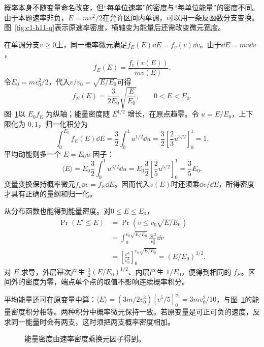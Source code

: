 \begin{solution}
概率本身不随变量命名改变，但“每单位速率”的密度与“每单位能量”的密度不同。由于本题速率非负，$E=mv^2/2$在允许区间内单调，可以用一条反函数分支变换。图~\ref{fig:c1-h11-q}表示原速率密度，横轴变为能量后还需改变微元宽度。


在单调分支$v\ge0$上，同一概率微元满足$f_E(E)\dd E=f_v(v)\dd v$。由于$\dd E=mv\dd v$，
\[f_E(E)=\frac{f_v(v(E))}{mv(E)}.
\]
令$E_0=mv_0^2/2$，代入$v/v_0=\sqrt{E/E_0}$可得
\[\boxed{f_E(E)=\frac3{2E_0}\sqrt{\frac E{E_0}}},\qquad0<E<E_0.
\]
图~\ref{fig:c1-h11-s}以 $E_0f_E$ 为纵轴；能量密度随 $E^{1/2}$ 增长，在原点趋零。令 $u=E/E_0$，上下限化为 $0,1$，归一化积分为
\[
\int_0^{E_0}f_E(E)\dd E=\frac32\int_0^1u^{1/2}\dd u
=\frac32\left[\frac23u^{3/2}\right]_0^1=1.
\]
平均动能则多一个 $E=E_0u$ 因子：
\[\langle E\rangle=E_0\frac32\int_0^1u^{3/2}\dd u
=E_0\frac32\left[\frac25u^{5/2}\right]_0^1=\boxed{\frac35E_0}.
\]
变量变换保持概率微元$f_v\dd v=f_E\dd E$。因而代入$v(E)$时还须乘$\dd v/\dd E$，所得密度才具有正确的量纲和归一化。


从分布函数也能得到能量密度。对$0\le E\le E_0$，
\begin{align*}
\Pr(E'\le E)&=\Pr\!\left(v\le v_0\sqrt{E/E_0}\right)\\
&=\int_0^{v_0\sqrt{E/E_0}}\frac{3v^2}{v_0^3}\dd v\\
&=\left[\frac{v^3}{v_0^3}\right]_0^{v_0\sqrt{E/E_0}}
=(E/E_0)^{3/2}.
\end{align*}
对 $E$ 求导，外层幂次产生 $\tfrac32(E/E_0)^{1/2}$、内层产生 $1/E_0$，便得到相同的 $f_E$。区间外的密度为零，端点单个点的取值不影响连续概率积分。

平均能量还可在原变量中算：$\langle E\rangle=(3m/2v_0^3)[v^5/5]_0^{v_0}=3mv_0^2/10$，与图~\ref{fig:c1-h11-s}的能量密度积分相等。两种积分中概率微元保持一致。若原变量是可正可负的速度，反求同一能量时会有两支，这时须把两支概率密度相加。

\begin{figure}[H]\centering
{}
\caption{能量密度由速率密度乘换元因子得到。}\label{fig:c1-h11-s}
\end{figure}
\end{solution}

